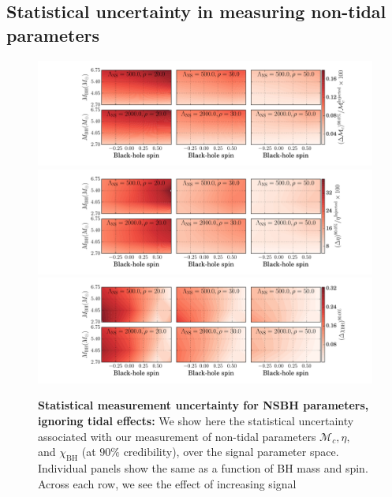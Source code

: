 \documentclass[aps,prd,amsmath,floats,floatfix, twocolumn,
superscriptaddress,nofootinbib,showpacs]{revtex4-1}
\newcommand{\chibh}{\chi_\mathrm{BH}}
\newcommand{\mchirp}{\mathcal{M}_c}
\begin{document}
\begin{appendix}

\section{Statistical uncertainty in measuring non-tidal parameters}\label{as1:nontidalerrors}
% 
\begin{figure}
\centering 
\includegraphics[trim = {2cm 0 0 0},width=2.\columnwidth]{TNMchirpCIWidths90_0_Lambda_SNR}\\
\includegraphics[trim = {2cm 0 0 0},width=2.\columnwidth]{TNEtaCIWidths90_0_Lambda_SNR}\\
\includegraphics[trim = {2cm 0 0 0},width=2.\columnwidth]{TNChiBHCIWidths90_0_Lambda_SNR}
\caption{{\bf Statistical measurement uncertainty for NSBH parameters,
ignoring tidal effects:}
We show here the statistical uncertainty associated with our measurement of
non-tidal parameters $\mchirp, \eta,$ and $\chibh$ (at $90\%$ credibility),
over the signal parameter space. Individual panels show the same as a function
of BH mass and spin. Across each row, we see the effect of increasing signal
}
\end{figure}
\end{appendix}
\end{document}
